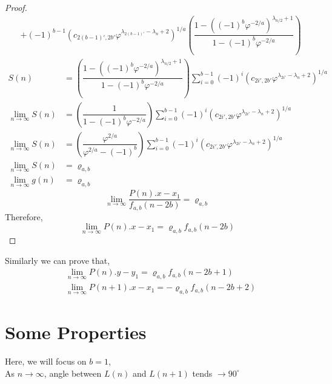 \documentclass[preprint,12pt]{elsarticle}
\begin{document}
\begin{proof}
\begin{align*}
		     & +(-1)^{b-1}(c_{2(b-1)',2b'}\varphi^{\lambda_{2(b-1)'}-\lambda_{n}+2})^{1/a}\left(\dfrac{1 - ((-1)^b\varphi^{-2/a})^{\lambda_{n/2}+1}}{1-(-1)^b\varphi^{-2/a}}\right) 
	\end{align*}
	\begin{align*}
		S(n)                    & = \left(\dfrac{1 - ((-1)^b\varphi^{-2/a})^{\lambda_{n/2}+1}}{1-(-1)^b\varphi^{-2/a}}\right)\displaystyle\sum_{i = 0}^{b-1}(-1)^i\left(c_{2i',2b'}\varphi^{\lambda_{2i'}-\lambda_{n}+2}\right)^{1/a} \\
		\lim_{n \to \infty}S(n) & = \left(\dfrac{1}{1-(-1)^b\varphi^{-2/a}}\right)\displaystyle\sum_{i = 0}^{b-1}(-1)^i\left(c_{2i',2b'}\varphi^{\lambda_{2i'}-\lambda_{n}+2}\right)^{1/a}                                            \\
		\lim_{n \to \infty}S(n) & = \left(\dfrac{\varphi^{2/a}}{\varphi^{2/a}-(-1)^b}\right)\displaystyle\sum_{i = 0}^{b-1}(-1)^i\left(c_{2i',2b'}\varphi^{\lambda_{2i'}-\lambda_{n}+2}\right)^{1/a}                                  \\
		\lim_{n \to \infty}S(n) & = \varrho_{a,b}                                                                                                                                                                                     \\
		\lim_{n \to \infty}g(n) & = \varrho_{a,b}                                                                                                                                                                                     
	\end{align*}
	$$
	\lim_{n \to \infty}\dfrac{P(n).x - x_1}{f_{a,b}(n - 2b)} = \varrho_{a,b}$$
	Therefore,
	$$\lim_{n \to \infty} P(n).x - x_1 = \varrho_{a,b}f_{a,b}(n - 2b)$$
\end{proof}
Similarly we can prove that,
\begin{align*}
	  & \lim_{n \to \infty} P(n).y -y_1 = \varrho_{a,b}f_{a,b}(n-2b+1)    \\
	  & \lim_{n \to \infty} P(n+1).x -x_1 = -\varrho_{a,b}f_{a,b}(n-2b+2) 
\end{align*}
\section{Some Properties}
Here, we will focus on $b =1$,\\

As $n \to \infty$, angle between $L(n)$ and $L(n+1)$ tends $\to 90^\circ$
\end{document}
